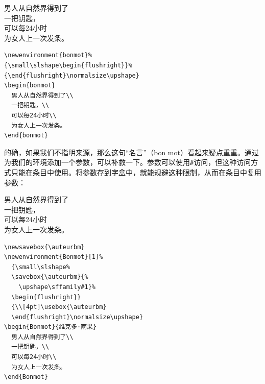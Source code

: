 \begin{codelist}[4.23]{
  \newenvironment{bonmot}%
{\small\slshape\begin{flushright}}%
{\end{flushright}\normalsize\upshape}
\begin{bonmot}
  男人从自然界得到了\\
  一把钥匙，\\
  可以每24小时\\
  为女人上一次发条。
\end{bonmot}
}
\begin{verbatim}
\newenvironment{bonmot}%
{\small\slshape\begin{flushright}}%
{\end{flushright}\normalsize\upshape}
\begin{bonmot}
  男人从自然界得到了\\
  一把钥匙，\\
  可以每24小时\\
  为女人上一次发条。
\end{bonmot}\end{verbatim}
\end{codelist}

的确，如果我们不指明来源，那么这句``名言''（bon mot）看起来疑点重重。通过为我们的环境添加一个参数，可以补救一下。参数可以使用\verb|#|访问，但这种访问方式只能在条目中使用。将参数存到字盒中，就能规避这种限制，从而在条目中复用参数：

\begin{codelist}[4.24]{
  \newsavebox{\auteurbm}
\newenvironment{Bonmot}[1]%
  {\small\slshape%
  \savebox{\auteurbm}{%
    \upshape\sffamily#1}%
  \begin{flushright}}
  {\\[4pt]\usebox{\auteurbm}
  \end{flushright}\normalsize\upshape}
\begin{Bonmot}{维克多·雨果}
  男人从自然界得到了\\
  一把钥匙，\\
  可以每24小时\\
  为女人上一次发条。
\end{Bonmot}
}
\begin{verbatim}
\newsavebox{\auteurbm}
\newenvironment{Bonmot}[1]%
  {\small\slshape%
  \savebox{\auteurbm}{%
    \upshape\sffamily#1}%
  \begin{flushright}}
  {\\[4pt]\usebox{\auteurbm}
  \end{flushright}\normalsize\upshape}
\begin{Bonmot}{维克多·雨果}
  男人从自然界得到了\\
  一把钥匙，\\
  可以每24小时\\
  为女人上一次发条。
\end{Bonmot}\end{verbatim}
\end{codelist}

